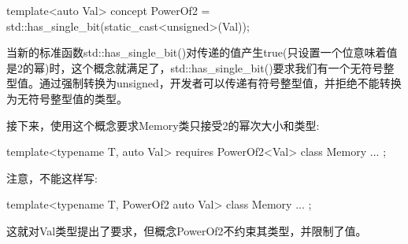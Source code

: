 \begin{cpp}
template<auto Val>
concept PowerOf2 = std::has_single_bit(static_cast<unsigned>(Val));
\end{cpp}

当新的标准函数std::has\_single\_bit()对传递的值产生true(只设置一个位意味着值是2的幂)时，这个概念就满足了，std::has\_single\_bit()要求我们有一个无符号整型值。通过强制转换为unsigned，开发者可以传递有符号整型值，并拒绝不能转换为无符号整型值的类型。

接下来，使用这个概念要求Memory类只接受2的幂次大小和类型:

\begin{cpp}
template<typename T, auto Val>
requires PowerOf2<Val>
class Memory {
	...
};
\end{cpp}

注意，不能这样写:

\begin{cpp}
template<typename T, PowerOf2 auto Val>
class Memory {
	...
};
\end{cpp}

这就对Val类型提出了要求，但概念PowerOf2不约束其类型，并限制了值。








